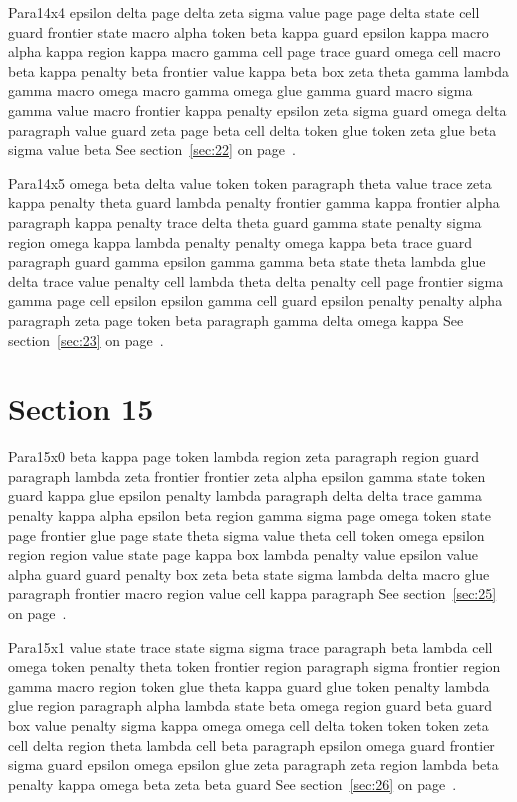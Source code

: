 \documentclass{article}
\begin{document}
Para14x4 epsilon delta page delta zeta sigma value page page delta state cell guard frontier state macro alpha token beta kappa guard epsilon kappa macro alpha kappa region kappa macro gamma cell page trace guard omega cell macro beta kappa penalty beta frontier value kappa beta box zeta theta gamma lambda gamma macro omega macro gamma omega glue gamma guard macro sigma gamma value macro frontier kappa penalty epsilon zeta sigma guard omega delta paragraph value guard zeta page beta cell delta token glue token zeta glue beta sigma value beta See section~\ref{sec:22} on page~\pageref{sec:6}.

Para14x5 omega beta delta value token token paragraph theta value trace zeta kappa penalty theta guard lambda penalty frontier gamma kappa frontier alpha paragraph kappa penalty trace delta theta guard gamma state penalty sigma region omega kappa lambda penalty penalty omega kappa beta trace guard paragraph guard gamma epsilon gamma gamma beta state theta lambda glue delta trace value penalty cell lambda theta delta penalty cell page frontier sigma gamma page cell epsilon epsilon gamma cell guard epsilon penalty penalty alpha paragraph zeta page token beta paragraph gamma delta omega kappa See section~\ref{sec:23} on page~\pageref{sec:7}.

\section{Section 15}\label{sec:15}
Para15x0 beta kappa page token lambda region zeta paragraph region guard paragraph lambda zeta frontier frontier zeta alpha epsilon gamma state token guard kappa glue epsilon penalty lambda paragraph delta delta trace gamma penalty kappa alpha epsilon beta region gamma sigma page omega token state page frontier glue page state theta sigma value theta cell token omega epsilon region region value state page kappa box lambda penalty value epsilon value alpha guard guard penalty box zeta beta state sigma lambda delta macro glue paragraph frontier macro region value cell kappa paragraph See section~\ref{sec:25} on page~\pageref{sec:5}.

Para15x1 value state trace state sigma sigma trace paragraph beta lambda cell omega token penalty theta token frontier region paragraph sigma frontier region gamma macro region token glue theta kappa guard glue token penalty lambda glue region paragraph alpha lambda state beta omega region guard beta guard box value penalty sigma kappa omega omega cell delta token token token zeta cell delta region theta lambda cell beta paragraph epsilon omega guard frontier sigma guard epsilon omega epsilon glue zeta paragraph zeta region lambda beta penalty kappa omega beta zeta beta guard See section~\ref{sec:26} on page~\pageref{sec:6}.
\end{document}
